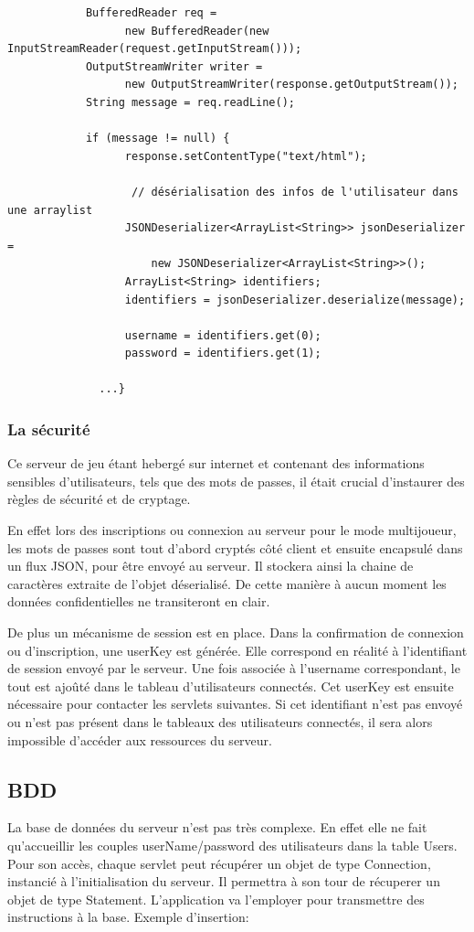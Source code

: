 \documentclass[a4paper,11pt]{report}
\begin{document}
		\begin{verbatim}
			BufferedReader req = 
				  new BufferedReader(new InputStreamReader(request.getInputStream()));
			OutputStreamWriter writer = 
				  new OutputStreamWriter(response.getOutputStream());
			String message = req.readLine();
			
			if (message != null) {
				  response.setContentType("text/html");
				
				   // désérialisation des infos de l'utilisateur dans une arraylist 
				  JSONDeserializer<ArrayList<String>> jsonDeserializer = 
					  new JSONDeserializer<ArrayList<String>>();
				  ArrayList<String> identifiers;
				  identifiers = jsonDeserializer.deserialize(message);
				
				  username = identifiers.get(0);
				  password = identifiers.get(1);
				  
			  ...}
		\end{verbatim}
		
		
		\subsubsection{La sécurité}
		Ce serveur de jeu étant hebergé sur internet et contenant des informations
		sensibles d'utilisateurs, tels que des mots de passes, il était crucial
		d'instaurer des règles de sécurité et de cryptage. 
		
		En effet lors des inscriptions ou connexion au serveur pour le mode
		multijoueur, les mots de passes sont tout d'abord cryptés côté client et
		ensuite encapsulé dans un flux JSON, pour être envoyé au serveur. Il stockera
		ainsi la chaine de caractères extraite de l'objet déserialisé. De cette
		manière à aucun moment les données confidentielles ne transiteront en clair.
		
		De plus un mécanisme de session est en place. Dans la confirmation de
		connexion ou d'inscription, une userKey est générée. Elle correspond en
		réalité à l'identifiant de session envoyé par le serveur. Une fois associée
		à l'username correspondant, le tout est ajoûté dans le tableau d'utilisateurs
		connectés.
		Cet userKey est ensuite nécessaire pour contacter les servlets suivantes. Si
		cet identifiant n'est pas envoyé ou n'est pas présent dans le tableaux des
		utilisateurs connectés, il sera alors impossible d'accéder aux ressources du
		serveur.
		
		\subsection{BDD}
		La base de données du serveur n'est pas très complexe. En effet elle ne fait
		qu'accueillir les couples userName/password des utilisateurs dans la
		table Users. 
		Pour son accès, chaque servlet peut récupérer un objet de type Connection,
		instancié à l'initialisation du serveur. Il permettra à son tour
		de récuperer un objet de type Statement. L'application va l'employer pour
		transmettre des instructions à la base. Exemple d'insertion: 
		
\end{document}

